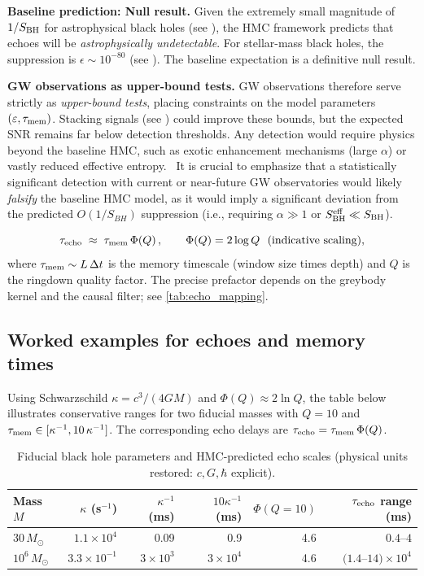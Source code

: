 \documentclass[a4paper,11pt]{article}
\newcommand{\ie}{i.e.\xspace}
\newcommand{\HMC}{\textsc{HMC}\xspace}
\theoremstyle{plain}
\theoremstyle{definition}
\theoremstyle{remark}
\begin{document}
\textbf{Baseline prediction: Null result.} Given the extremely small magnitude of $1/S_{\rm BH}$ for astrophysical black holes (see ), the \HMC{} framework predicts that echoes will be \emph{astrophysically undetectable}. For stellar-mass black holes, the suppression is $\epsilon\sim 10^{-80}$ (see ). The baseline expectation is a definitive null result.

\textbf{GW observations as upper-bound tests.} GW observations therefore serve strictly as \emph{upper-bound tests}, placing constraints on the model parameters $(\varepsilon,\tau_{\rm mem})$. Stacking signals (see ) could improve these bounds, but the expected SNR remains far below detection thresholds. Any detection would require physics beyond the baseline \HMC{}, such as exotic enhancement mechanisms (large $\alpha$) or vastly reduced effective entropy.
\ It is crucial to emphasize that a statistically significant detection with current or near-future GW observatories would likely \emph{falsify} the baseline \HMC{} model, as it would imply a significant deviation from the predicted $O(1/S_{BH})$ suppression (\ie, requiring $\alpha \gg 1$ or $S_{\rm BH}^{\rm eff} \ll S_{\rm BH}$).

\begin{equation}
\label{eq:echo-delay}
\tau_{\rm echo}\;\approx\; \tau_{\rm mem}\,\Phi(Q)\,,\qquad \Phi(Q)= 2\log Q \ \ \text{(indicative scaling)},
\end{equation}
where \(\tau_{\rm mem}\sim L\,\Delta t\) is the memory timescale (window size times depth) and \(Q\) is the ringdown quality factor. The precise prefactor depends on the greybody kernel and the causal filter; see \cref{tab:echo_mapping}.

\subsection*{Worked examples for echoes and memory times}
Using Schwarzschild $\kappa=c^3/(4GM)$ and $\Phi(Q)\approx 2\ln Q$, the table below illustrates
conservative ranges for two fiducial masses with $Q=10$ and $\tau_{\rm mem}\in[\kappa^{-1},10\,\kappa^{-1}]$.
The corresponding echo delays are $\tau_{\rm echo}=\tau_{\rm mem}\,\Phi(Q)$.
\begin{table}[htbp]
\centering
\caption{Fiducial black hole parameters and \HMC{}-predicted echo scales (physical units restored: $c,G,\hbar$ explicit).}
\label{tab:echo-worked-examples}
\footnotesize
\begin{tabular}{l r r r r r}
\toprule
\textbf{Mass $M$} & \textbf{$\kappa$ (s$^{-1}$)} & \textbf{$\kappa^{-1}$ (ms)} & \textbf{$10\kappa^{-1}$ (ms)} & \textbf{$\Phi(Q{=}10)$} & \textbf{$\tau_{\rm echo}$ range (ms)} \\
\midrule
$30\,M_\odot$ & $1.1\times 10^4$ & 0.09 & 0.9 & 4.6 & $0.4$--$4$ \\
$10^6\,M_\odot$ & $3.3\times 10^{-1}$ & $3\times 10^3$ & $3\times 10^4$ & 4.6 & $(1.4$--$14)\times 10^4$ \\
\bottomrule
\end{tabular}
\vspace{0.5em}
\end{table}
\end{document}
